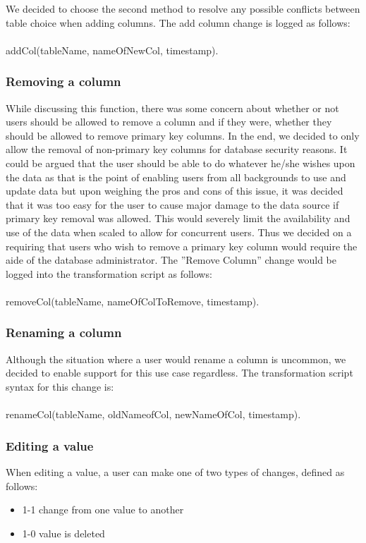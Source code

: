 \documentclass[12pt]{article}
\begin{document}
We decided to choose the second method to resolve any possible conflicts between table choice when adding columns. The add column change is logged as follows: \\ \\
addCol(tableName, nameOfNewCol, timestamp). 

\subsubsection{Removing a column}
\label{sec:remove_col}
While discussing this function, there was some concern about whether or not users should be allowed to remove a column and if they were, whether they should be allowed to remove primary key columns. In the end, we decided to only allow the removal of non-primary key columns for database security reasons. It could be argued that the user should be able to do whatever he/she wishes upon the data as that is the point of enabling users from all backgrounds to use and update data but upon weighing the pros and cons of this issue, it was decided that it was too easy for the user to cause major damage to the data source if primary key removal was allowed.  This would severely limit the availability and use of the data when scaled to allow for concurrent users.  Thus we decided on a requiring that users who wish to remove a primary key column would require the aide of the database administrator. The ''Remove Column'' change would be logged into the transformation script as follows: \\ \\
removeCol(tableName, nameOfColToRemove, timestamp).

\subsubsection{Renaming a column}
\label{sec:rename_col}
Although the situation where a user would rename a column is uncommon, we decided to enable support for this use case regardless. The transformation script syntax for this change is: \\ \\ renameCol(tableName, oldNameofCol, newNameOfCol, timestamp).

\subsubsection{Editing a value}
\label{sec:edit_value}
When editing a value, a user can make one of two types of changes, defined as follows:
\begin{itemize}
\item 1-1 \textemdash change from one value to another
\item 1-0 \textemdash value is deleted
\end{itemize}
\end{document}
